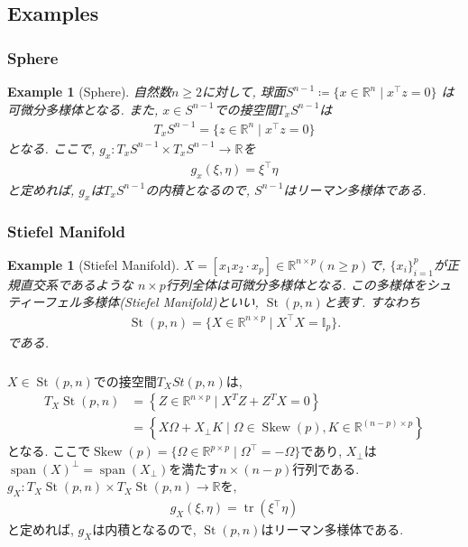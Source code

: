 \documentclass[dvipdfmx,11pt]{beamer}		%
\newtheorem{exam}[defi]{Example}
\newcommand{\R}{\mathbb{R}}
\begin{document}
    \subsection{Examples}
    \begin{frame}\frametitle{Sphere}
        \begin{exam}[Sphere]
            自然数$n\geq2$に対して, 球面$S^{n - 1}\coloneqq\{x\in\R^n\mid x^{\top}z = 0\}$
            は可微分多様体となる. また, $x\in S^{n - 1}$での接空間$T_xS^{n-1}$は
            \begin{align*}
                T_xS^{n - 1} = \{z\in\R^n\mid x^{\top}z = 0\}
            \end{align*}
            となる. ここで, $g_x : T_xS^{n - 1}\times T_xS^{n - 1}\to\R$を
            \begin{align*}
                g_x(\xi, \eta) = \xi^{\top}\eta
            \end{align*}
            と定めれば, $g_x$は$T_xS^{n-1}$の内積となるので, $S^{n - 1}$はリーマン多様体である.
        \end{exam}
    \end{frame}
    \begin{frame}\frametitle{Stiefel Manifold}
        \begin{exam}[Stiefel Manifold]
            $X = [x_1x_2\cdot x_p]\in\R^{n\times p}(n\geq p)$で, $\{x_i\}_{i = 1}^p$が正規直交系であるような
            $n\times p$行列全体は可微分多様体となる. この多様体をシュティーフェル多様体(Stiefel Manifold)といい, 
            $\operatorname{St}(p, n)$と表す. すなわち
            \begin{align*}
                \operatorname{St}(p, n) = \{X\in\R^{n\times p}\mid X^{\top}X = \mathbb{I}_{p}\}.
            \end{align*}
            である.
        \end{exam}
    \end{frame}

    \begin{frame}\frametitle{}
        $X\in\operatorname{St}(p, n)$での接空間$T_{X}St(p, n)$は, 
        \begin{align*}
            T_{X} \operatorname{St}(p, n)&=\left\{Z \in \mathbb{R}^{n \times p}\mid X^{T} Z+Z^{T} X=0\right\}\\
                                         &= \left\{X \Omega+X_{\perp} K\mid \Omega\in\operatorname{Skew}(p), K \in \mathbb{R}^{(n-p) \times p}\right\}
        \end{align*}
        となる. ここで$\operatorname{Skew}(p) = \{\Omega\in\R^{p\times p}\mid \Omega^{\top} = -\Omega\}$であり, 
        $X_{\perp}$は$\operatorname{span}(X)^{\perp} = \operatorname{span}(X_{\perp})$を満たす$n\times (n - p)$行列である.
        $g_{X} : T_{X}\operatorname{St}(p, n)\times T_{X}\operatorname{St}(p, n)\to\R$を,
        \begin{align*}
            g_{X}(\xi, \eta) = \operatorname{tr}(\xi^{\top} \eta)
        \end{align*}
        と定めれば, $g_{X}$は内積となるので, $\operatorname{St}(p, n)$はリーマン多様体である. 
    \end{frame}
\end{document}
